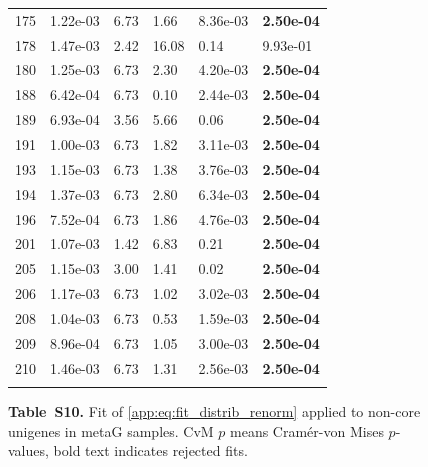 \begin{figure}[htbp!]
{\begin{minipage}[t]{0.48\linewidth}
\begin{tabular}{llllll}
                    175 & 1.22e-03 & 6.73 & 1.66 & 8.36e-03 & \textbf{2.50e-04}\\
                    178 & 1.47e-03 & 2.42 & 16.08 & 0.14 & 9.93e-01\\
                    180 & 1.25e-03 & 6.73 & 2.30 & 4.20e-03 & \textbf{2.50e-04}\\
                    188 & 6.42e-04 & 6.73 & 0.10 & 2.44e-03 & \textbf{2.50e-04}\\
                    189 & 6.93e-04 & 3.56 & 5.66 & 0.06 & \textbf{2.50e-04}\\
                    191 & 1.00e-03 & 6.73 & 1.82 & 3.11e-03 & \textbf{2.50e-04}\\
                    193 & 1.15e-03 & 6.73 & 1.38 & 3.76e-03 & \textbf{2.50e-04}\\
                    194 & 1.37e-03 & 6.73 & 2.80 & 6.34e-03 & \textbf{2.50e-04}\\
                    196 & 7.52e-04 & 6.73 & 1.86 & 4.76e-03 & \textbf{2.50e-04}\\
                    201 & 1.07e-03 & 1.42 & 6.83 & 0.21 & \textbf{2.50e-04}\\
                    205 & 1.15e-03 & 3.00 & 1.41 & 0.02 & \textbf{2.50e-04}\\
                    206 & 1.17e-03 & 6.73 & 1.02 & 3.02e-03 & \textbf{2.50e-04}\\
                    208 & 1.04e-03 & 6.73 & 0.53 & 1.59e-03 & \textbf{2.50e-04}\\
                    209 & 8.96e-04 & 6.73 & 1.05 & 3.00e-03 & \textbf{2.50e-04}\\
                    210 & 1.46e-03 & 6.73 & 1.31 & 2.56e-03 & \textbf{2.50e-04}\\
                     &  &  &  &  & \\
        \bottomrule
        \end{tabular}
    \end{minipage}
    }
    \caption*{\textbf{Table~S10.} Fit of \eqref{app:eq:fit_distrib_renorm} applied to non-core unigenes in metaG samples. CvM $p$ means Cram\'er-von Mises $p$-values, bold text indicates rejected fits.}
    \label{subtab:app:core:metaG:non_core}
\end{figure}
